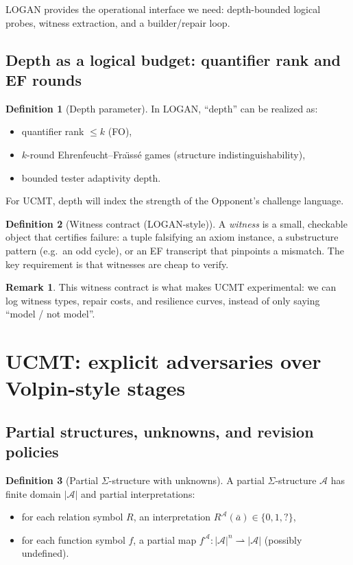 \documentclass[11pt]{article}
\theoremstyle{definition}
\newtheorem{definition}{Definition}[section]
\newtheorem{remark}{Remark}[section]
\theoremstyle{plain}
\newcommand{\Sig}{\Sigma}
\newcommand{\Struct}{\mathcal{A}}
\newcommand{\Univ}{\left|\Struct\right|}
\begin{document}
LOGAN \cite{Mannucci2025LOGAN} provides the operational interface we need:
depth-bounded logical probes, witness extraction, and a builder/repair loop.

\subsection{Depth as a logical budget: quantifier rank and EF rounds}

\begin{definition}[Depth parameter]
In LOGAN, ``depth'' can be realized as:
\begin{itemize}[leftmargin=1.5em]
\item quantifier rank $\le k$ (FO),
\item $k$-round Ehrenfeucht--Fra\"{\i}ss\'e games (structure indistinguishability),
\item bounded tester adaptivity depth.
\end{itemize}
For UCMT, depth will index the strength of the Opponent's challenge language.
\end{definition}

\begin{definition}[Witness contract (LOGAN-style)]
A \emph{witness} is a small, checkable object that certifies failure:
a tuple falsifying an axiom instance, a substructure pattern (e.g.\ an odd cycle),
or an EF transcript that pinpoints a mismatch. The key requirement is that witnesses are cheap to verify.
\end{definition}

\begin{remark}
This witness contract is what makes UCMT experimental: we can log witness types, repair costs, and resilience curves,
instead of only saying ``model / not model''.
\end{remark}

\section{UCMT: explicit adversaries over Volpin-style stages}

\subsection{Partial structures, unknowns, and revision policies}

\begin{definition}[Partial $\Sig$-structure with unknowns]\label{def:partial}
A partial $\Sig$-structure $\Struct$ has finite domain $\Univ$ and partial interpretations:
\begin{itemize}[leftmargin=1.5em]
\item for each relation symbol $R$, an interpretation $R^\Struct(\bar a)\in\{0,1,?\}$,
\item for each function symbol $f$, a partial map $f^\Struct:\Univ^n\rightharpoonup \Univ$ (possibly undefined).
\end{itemize}
\end{definition}
\end{document}
